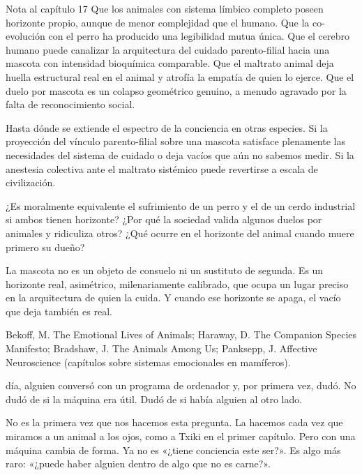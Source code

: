 \begin{notacap}{Nota al capítulo 17}
 Que los animales con sistema límbico completo poseen horizonte propio, aunque de menor complejidad que el humano. Que la co-evolución con el perro ha producido una legibilidad mutua única. Que el cerebro humano puede canalizar la arquitectura del cuidado parento-filial hacia una mascota con intensidad bioquímica comparable. Que el maltrato animal deja huella estructural real en el animal y atrofía la empatía de quien lo ejerce. Que el duelo por mascota es un colapso geométrico genuino, a menudo agravado por la falta de reconocimiento social.

 Hasta dónde se extiende el espectro de la conciencia en otras especies. Si la proyección del vínculo parento-filial sobre una mascota satisface plenamente las necesidades del sistema de cuidado o deja vacíos que aún no sabemos medir. Si la anestesia colectiva ante el maltrato sistémico puede revertirse a escala de civilización.

 ¿Es moralmente equivalente el sufrimiento de un perro y el de un cerdo industrial si ambos tienen horizonte? ¿Por qué la sociedad valida algunos duelos por animales y ridiculiza otros? ¿Qué ocurre en el horizonte del animal cuando muere primero su dueño?

 La mascota no es un objeto de consuelo ni un sustituto de segunda. Es un horizonte real, asimétrico, milenariamente calibrado, que ocupa un lugar preciso en la arquitectura de quien la cuida. Y cuando ese horizonte se apaga, el vacío que deja también es real.

 Bekoff, M. The Emotional Lives of Animals; Haraway, D. The Companion Species Manifesto; Bradshaw, J. The Animals Among Us; Panksepp, J. Affective Neuroscience (capítulos sobre sistemas emocionales en mamíferos).
\end{notacap}
\noindent {} día, alguien conversó con un programa de ordenador y, por primera vez, dudó. No dudó de si la máquina era útil. Dudó de si había alguien al otro lado.

No es la primera vez que nos hacemos esta pregunta. La hacemos cada vez que miramos a un animal a los ojos, como a Txiki en el primer capítulo. Pero con una máquina cambia de forma. Ya no es «¿tiene conciencia este ser?». Es algo más raro: «¿puede haber alguien dentro de algo que no es carne?».

